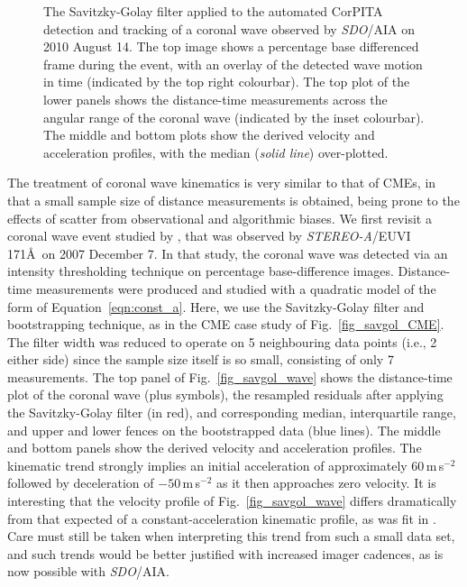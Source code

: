 \documentclass[structabstract]{aa}
\begin{document}
\begin{figure}[!t]
\caption{The Savitzky-Golay filter applied to the automated CorPITA detection and tracking of a coronal wave observed by \emph{SDO}/AIA on 2010 August 14. The top image shows a percentage base differenced frame during the event, with an overlay of the detected wave motion in time (indicated by the top right colourbar). The top plot of the lower panels shows the distance-time measurements across the angular range of the coronal wave (indicated by the inset colourbar). The middle and bottom plots show the derived velocity and acceleration profiles, with the median (\emph{solid line}) over-plotted.}
\label{fig_savgol_wave_CorPITA}
\end{figure}

The treatment of coronal wave kinematics is very similar to that of CMEs, in that a small sample size of distance measurements is obtained, being prone to the effects of scatter from observational and algorithmic biases. We first revisit a coronal wave event studied by \citet{2011A&A...531A..42L}, that was observed by \emph{STEREO-A}/EUVI 171\AA\ on 2007 December 7. In that study, the coronal wave was detected via an intensity thresholding technique on percentage base-difference images. Distance-time measurements were produced and studied with a quadratic model of the form of Equation~\ref{eqn:const_a}. Here, we use the Savitzky-Golay filter and bootstrapping technique, as in the CME case study of Fig.~\ref{fig_savgol_CME}. The filter width was reduced to operate on 5 neighbouring data points (i.e., 2 either side) since the sample size itself is so small, consisting of only 7 measurements. The top panel of Fig.~\ref{fig_savgol_wave} shows the distance-time plot of the coronal wave (plus symbols), the resampled residuals after applying the Savitzky-Golay filter (in red), and corresponding median, interquartile range, and upper and lower fences on the bootstrapped data (blue lines). The middle and bottom panels show the derived velocity and acceleration profiles. The kinematic trend strongly implies an initial acceleration of approximately 60\,m\,s$^{-2}$ followed by deceleration of $-50$\,m\,s$^{-2}$ as it then approaches zero velocity. It is interesting that the velocity profile of Fig.~\ref{fig_savgol_wave} differs dramatically from that expected of a constant-acceleration kinematic profile, as was fit in \citet{2011A&A...531A..42L}. Care must still be taken when interpreting this trend from such a small data set, and such trends would be better justified with increased imager cadences, as is now possible with \emph{SDO}/AIA.
\end{document}
